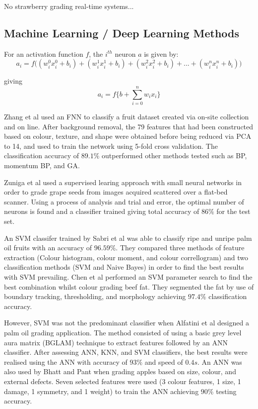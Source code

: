 \documentclass[fleqn,twoside]{article}
\begin{document}
No strawberry grading real-time systems...



\subsection{Machine Learning / Deep Learning Methods}


For an activation function $f$, the $i^{th}$ neuron $a$ is given by:
\begin{equation}
a_i = f\bigg((w_i^0 x_i^0 + b_i) + (w_i^1 x_i^1 + b_i) + (w_i^2 x_i^2 + b_i) + ... + (w_i^n x_i^n + b_i)\bigg)
\end{equation}

giving 
\begin{equation}
a_i = f\bigg\{b + \sum_{i=0}^{n} w_i x_i \bigg\}	
\end{equation}





Zhang et al \cite{zhang} used an FNN to classify a fruit dataset created via on-site collection and on line. After background removal, the 79 features that had been constructed based on colour, texture, and shape were obtained before being reduced via PCA to 14, and used to train the network using 5-fold cross validation. The classification accuracy of $89.1\%$ outperformed other methods tested such as BP, momentum BP, and GA. 

Zuniga et al \cite{zuniga} used a supervised learing approach with small neural networks in order to grade grape seeds from images acquired scattered over a flat-bed scanner. Using a process of analysis and trial and error, the optimal number of neurons is found and a classifier trained giving total accuracy of $86\%$ for the test set. 

An SVM classifer trained by Sabri et al \cite{sabri} was able to classify ripe and unripe palm oil fruits with an accuracy of $96.59\%$. They compared three methods of feature extraction (Colour histogram, colour moment, and colour correllogram) and two classification methods (SVM and Naive Bayes) in order to find the best results with SVM prevailing. Chen et al \cite{chen} performed an SVM parameter search to find the best combination whilst colour grading beef fat. They segmented the fat by use of boundary tracking, thresholding, and morphology achieving $97.4\%$ classification accuracy.

However, SVM was not the predominant classifier when Alfatini et al \cite{alfatni} designed a palm oil grading application. The method consisted of using a basic grey level aura matrix (BGLAM) technique to extract features followed by an ANN classifier. After assessing ANN, KNN, and SVM classifiers, the best results were realised using the ANN with accuracy of $93\%$ and speed of $0.4s$. An ANN was also used by Bhatt and Pant \cite{bhatt} when grading apples based on size, colour, and external defects. Seven selected features were used (3 colour features, 1 size, 1 damage, 1 symmetry, and 1 weight) to train the ANN achieving $90\%$ testing accuracy. 
\end{document}
